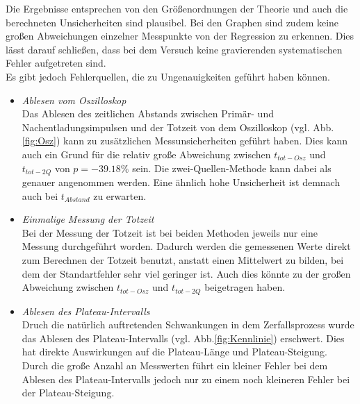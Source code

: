 \newpage
\noindent Die Ergebnisse entsprechen von den Größenordnungen der Theorie und auch die berechneten Unsicherheiten
sind plausibel. Bei den Graphen sind zudem keine großen Abweichungen einzelner Messpunkte von der 
Regression zu erkennen. Dies lässt darauf schließen, dass bei dem Versuch keine gravierenden systematischen
Fehler aufgetreten sind.
\\
Es gibt jedoch Fehlerquellen, die zu Ungenauigkeiten geführt haben können. 
\begin{itemize}
    \item \textit{Ablesen vom Oszilloskop}\\
        Das Ablesen des zeitlichen Abstands zwischen Primär- und Nachentladungsimpulsen und der Totzeit
        von dem Oszilloskop (vgl. Abb.\ref{fig:Osz}) kann zu zusätzlichen Messunsicherheiten geführt haben.
        Dies kann auch ein Grund für die relativ große Abweichung zwischen $t_{tot-Osz}$ und 
        $t_{tot-2Q}$ von $p=\num{-39.18}\%$ sein. Die zwei-Quellen-Methode kann dabei als 
        genauer angenommen werden. Eine ähnlich hohe Unsicherheit ist demnach auch bei $t_{Abstand}$
        zu erwarten. 
    \item \textit{Einmalige Messung der Totzeit}\\
        Bei der Messung der Totzeit ist bei beiden Methoden jeweils nur eine Messung durchgeführt worden.
        Dadurch werden die gemessenen Werte direkt zum Berechnen der Totzeit benutzt, anstatt einen 
        Mittelwert zu bilden, bei dem der Standartfehler sehr viel geringer ist. Auch dies könnte zu 
        der großen Abweichung zwischen $t_{tot-Osz}$ und $t_{tot-2Q}$ beigetragen haben.
    \item \textit{Ablesen des Plateau-Intervalls}\\
        Druch die natürlich auftretenden Schwankungen in dem Zerfallsprozess wurde das Ablesen des 
        Plateau-Intervalls (vgl. Abb.\ref{fig:Kennlinie}) erschwert. Dies hat direkte Auswirkungen auf
        die Plateau-Länge und Plateau-Steigung. Durch die große Anzahl an Messwerten führt ein kleiner
        Fehler bei dem Ablesen des Plateau-Intervalls jedoch nur zu einem noch kleineren Fehler bei der
        Plateau-Steigung.
\end{itemize}
